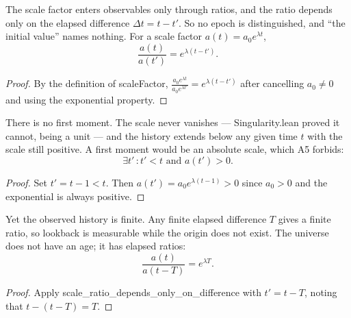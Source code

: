 \begin{theorem}
The scale factor enters observables only through ratios, and the ratio depends only on the elapsed difference $\Delta t = t - t'$.  So no epoch is distinguished, and ``the initial value'' names nothing.  For a scale factor $a(t) = a_0 e^{\lambda t}$,
\begin{equation}
\frac{a(t)}{a(t')} = e^{\lambda(t - t')}.
\end{equation}
\begin{proof}
By the definition of scaleFactor, $\frac{a_0 e^{\lambda t}}{a_0 e^{\lambda t'}} = e^{\lambda(t - t')}$ after cancelling $a_0 \neq 0$ and using the exponential property.
\end{proof}
\end{theorem}

\begin{theorem}
There is no first moment.  The scale never vanishes — Singularity.lean proved it cannot, being a unit — and the history extends below any given time $t$ with the scale still positive.  A first moment would be an absolute scale, which A5 forbids:
\begin{equation}
\exists t' \, : t' < t \text{ and } a(t') > 0.
\end{equation}
\begin{proof}
Set $t' = t - 1 < t$. Then $a(t') = a_0 e^{\lambda(t-1)} > 0$ since $a_0 > 0$ and the exponential is always positive.
\end{proof}
\end{theorem}

\begin{theorem}
Yet the observed history is finite.  Any finite elapsed difference $T$ gives a finite ratio, so lookback is measurable while the origin does not exist.  The universe does not have an age; it has elapsed ratios:
\begin{equation}
\frac{a(t)}{a(t - T)} = e^{\lambda T}.
\end{equation}
\begin{proof}
Apply scale\_ratio\_depends\_only\_on\_difference with $t' = t - T$, noting that $t - (t - T) = T$.
\end{proof}
\end{theorem}

